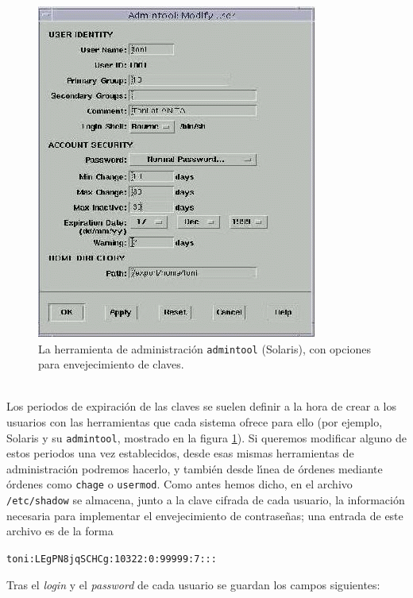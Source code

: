 \begin{figure}[t]
\vspace{0.5in}
\begin{center}
\includegraphics{admintool.png}
\vspace{0.3in}
\end{center}
\caption{La herramienta de administraci\'on {\tt admintool} (Solaris), con
opciones para envejecimiento de claves.}
\label{admintool}
\end{figure}
\\Los periodos de expiraci\'on de las claves se suelen definir a la hora de
crear a los usuarios con las herramientas que cada sistema ofrece para ello
(por ejemplo, Solaris y su {\tt admintool}, mostrado en la figura \ref{admintool}). 
Si queremos modificar alguno de estos periodos una vez establecidos, desde esas
mismas herramientas de administraci\'on podremos hacerlo, y tambi\'en desde
l\'{\i}nea de \'ordenes mediante \'ordenes como {\tt chage} o {\tt usermod}.
Como antes hemos dicho, en el archivo {\tt /etc/shadow} se almacena, junto a la 
clave cifrada de cada usuario, la informaci\'on necesaria para implementar el 
envejecimiento de contrase\~nas; una entrada de este archivo es de la forma
\begin{center}
{\tt toni:LEgPN8jqSCHCg:10322:0:99999:7:::}
\end{center}
Tras el {\it login} y el {\it password} de cada usuario se guardan los campos 
siguientes:
